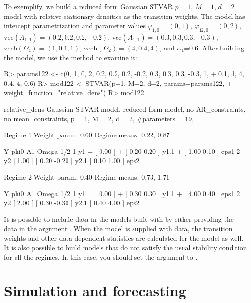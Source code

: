 \documentclass[nojss]{jss}
\begin{document}
To exemplify, we build a reduced form Gaussian STVAR $p=1$, $M=1$, $d=2$ model with relative stationary densities as the transition weights. The model has intercept parametrization and parameter values $\varphi_{1,0}=(0, 1)$, $\varphi_{12,0}=(0, 2)$, $\text{vec}(A_{1,1}) = (0.2, 0.2, 0.2, -0.2)$, $\text{vec}(A_{1,1}) = (0.3, 0.3, 0.3, -0.3)$, $\text{vech}(\Omega_1) = (1, 0.1, 1)$, $\text{vech}(\Omega_2) = (4, 0.4, 4)$, and $\alpha_1$=0.6. After building the model, we use the  method to examine it:
%
\begin{CodeChunk}
\begin{CodeInput}
R> params122 <- c(0, 1, 0, 2, 0.2, 0.2, 0.2, -0.2, 0.3, 0.3, 0.3, -0.3, 1,
+    0.1, 1, 4, 0.4, 4, 0.6)
R> mod122 <- STVAR(p=1, M=2, d=2, params=params122,
+    weight_function="relative_dens")
R> mod122
\end{CodeInput}
\begin{CodeOutput}
relative_dens Gaussian STVAR model, reduced form model, no AR_constraints,
no mean_constraints,
  p = 1, M = 2, d = 2, #parameters = 19,

Regime 1
Weight param: 0.60
Regime means: 0.22, 0.87

   Y     phi0          A1                  Omega        1/2
1 y1 = [ 0.00 ] + [  0.20  0.20 ] y1.1 + [  1.00 0.10 ]     eps1
2 y2   [ 1.00 ]   [  0.20 -0.20 ] y2.1   [  0.10 1.00 ]     eps2

Regime 2
Weight param: 0.40
Regime means: 0.73, 1.71

   Y     phi0          A1                  Omega        1/2
1 y1 = [ 0.00 ] + [  0.30  0.30 ] y1.1 + [  4.00 0.40 ]     eps1
2 y2   [ 2.00 ]   [  0.30 -0.30 ] y2.1   [  0.40 4.00 ]     eps2
\end{CodeOutput}
\end{CodeChunk}
%

It is possible to include data in the models built with  by either providing the data in the argument . When the model is supplied with data, the transition weights and other data dependent statistics are calculated for the model as well. It is also possible to build models that do not satisfy the usual stability condition for all the regimes. In this case, you should set the argument  to .


\section{Simulation and forecasting}\label{sec:simufore}
\end{document}
